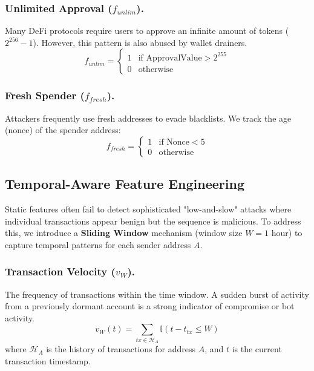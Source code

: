 \subsubsection{Unlimited Approval ($f_{unlim}$).}
Many DeFi protocols require users to approve an infinite amount of tokens ($2^{256}-1$). However, this pattern is also abused by wallet drainers.
\begin{equation}
    f_{unlim} = \begin{cases} 
    1 & \text{if } \text{ApprovalValue} > 2^{255} \\
    0 & \text{otherwise}
    \end{cases}
\end{equation}

\subsubsection{Fresh Spender ($f_{fresh}$).}
Attackers frequently use fresh addresses to evade blacklists. We track the age (nonce) of the spender address:
\begin{equation}
    f_{fresh} = \begin{cases} 
    1 & \text{if } \text{Nonce} < 5 \\
    0 & \text{otherwise}
    \end{cases}
\end{equation}

\subsection{Temporal-Aware Feature Engineering}
Static features often fail to detect sophisticated "low-and-slow" attacks where individual transactions appear benign but the sequence is malicious. To address this, we introduce a \textbf{Sliding Window} mechanism (window size $W=1$ hour) to capture temporal patterns for each sender address $A$.

\subsubsection{Transaction Velocity ($v_{W}$).}
The frequency of transactions within the time window. A sudden burst of activity from a previously dormant account is a strong indicator of compromise or bot activity.
\begin{equation}
    v_{W}(t) = \sum_{tx \in \mathcal{H}_A} \mathbb{I}(t - t_{tx} \leq W)
\end{equation}
where $\mathcal{H}_A$ is the history of transactions for address $A$, and $t$ is the current transaction timestamp.

